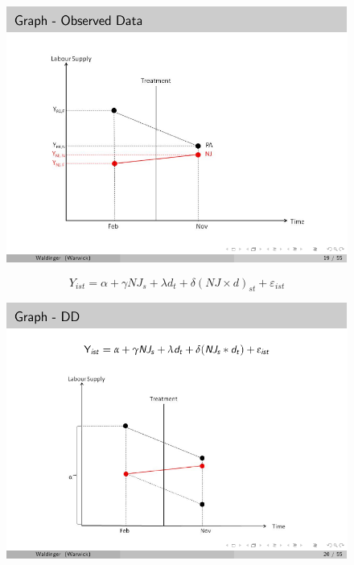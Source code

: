 \documentclass[notes=show]{beamer}
\begin{document}
\begin{frame}[plain]

	\begin{figure}
	\includegraphics{./lecture_includes/waldinger_dd_1.pdf}
	\end{figure}
	
\end{frame}


\begin{frame}[plain]
	
	$$Y_{ist} = \alpha + \gamma NJ_s + \lambda d_t + \delta(NJ\times d)_{st} + \varepsilon_{ist}$$
	\begin{figure}
	\includegraphics[scale=0.90]{./lecture_includes/waldinger_dd_2.pdf}
	\end{figure}
\end{frame}
\end{document}
